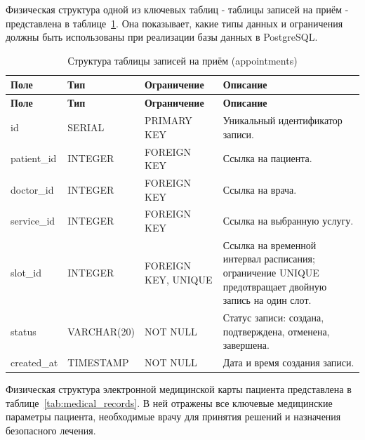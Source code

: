 Физическая структура одной из ключевых таблиц - таблицы записей на приём - представлена в таблице~\ref{tab:appointments}. Она показывает, какие типы данных и ограничения должны быть использованы при реализации базы данных в PostgreSQL.

{\small
\setlength{\tabcolsep}{4pt}
\renewcommand{\arraystretch}{1.12}
\begin{longtable}{|>{\raggedright\arraybackslash}p{}|>{\raggedright\arraybackslash}p{}|>{\raggedright\arraybackslash}p{}|>{\raggedright\arraybackslash}p{}|}
\caption{Структура таблицы записей на приём (appointments)}\label{tab:appointments}\\
\hline
\textbf{Поле} & \textbf{Тип} & \textbf{Ограничение} & \textbf{Описание} \\ \hline
\endfirsthead
\tabcont{\ref{tab:appointments}}
\textbf{Поле} & \textbf{Тип} & \textbf{Ограничение} & \textbf{Описание} \\ \hline
\endhead
id & SERIAL & PRIMARY KEY & Уникальный идентификатор записи. \\ \hline
patient\_id & INTEGER & FOREIGN KEY & Ссылка на пациента. \\ \hline
doctor\_id & INTEGER & FOREIGN KEY & Ссылка на врача. \\ \hline
service\_id & INTEGER & FOREIGN KEY & Ссылка на выбранную услугу. \\ \hline
slot\_id & INTEGER & FOREIGN KEY, UNIQUE & Ссылка на временной интервал расписания; ограничение UNIQUE предотвращает двойную запись на один слот. \\ \hline
status & VARCHAR(20) & NOT NULL & Статус записи: создана, подтверждена, отменена, завершена. \\ \hline
created\_at & TIMESTAMP & NOT NULL & Дата и время создания записи. \\ \hline
\end{longtable}
}

Физическая структура электронной медицинской карты пациента представлена в таблице~\ref{tab:medical_records}. В ней отражены все ключевые медицинские параметры пациента, необходимые врачу для принятия решений и назначения безопасного лечения.

